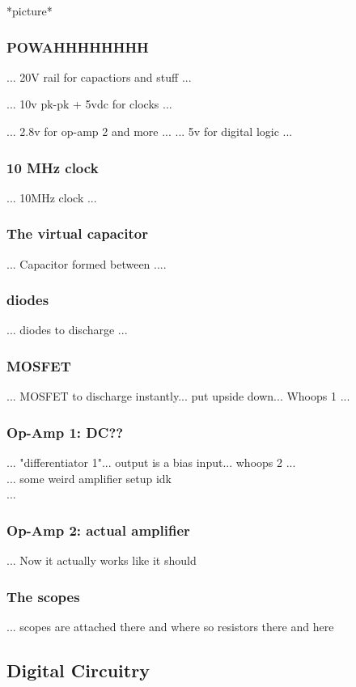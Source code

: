 \documentclass[11pt]{article} %
\begin{document}
*picture*

\subsubsection{POWAHHHHHHHH}

... 20V rail for capactiors and stuff ...

... 10v pk-pk + 5vdc for clocks ...


... 2.8v for op-amp 2 and more ...
... 5v for digital logic ...

\subsubsection{10 MHz clock}
... 10MHz clock ...
\\
\subsubsection{The virtual capacitor}
... Capacitor formed between ....
\\
\subsubsection{diodes}
... diodes to discharge ...
\\
\subsubsection{MOSFET}
... MOSFET to discharge instantly... put upside down... Whoops 1 ...
\\
\subsubsection{Op-Amp 1: DC??}
... "differentiator 1"... output is a bias input... whoops 2 ...
\\
... some weird amplifier setup idk
\\
... 
\subsubsection{Op-Amp 2: actual amplifier}
... Now it actually works like it should

\subsubsection{The scopes}
... scopes are attached there and where so resistors there and here

\subsection{Digital Circuitry}
\end{document}
